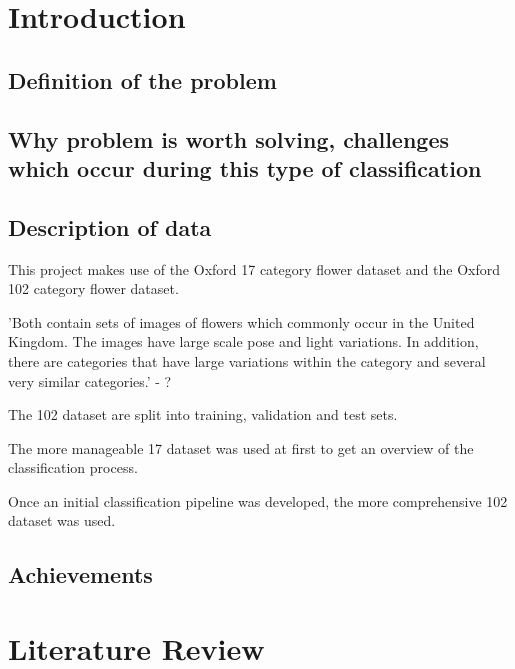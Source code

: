 \documentclass[11pt, a4paper]{report}
\begin{document}
\setlength{\parskip}{0.0cm}
\tableofcontents
\setlength{\parskip}{0.4cm}


\chapter{Introduction}

\section{Definition of the problem} 

\section{Why problem is worth solving, challenges which occur during this type of classification}

\section{Description of data}

This project makes use of the Oxford 17 category flower dataset and the Oxford 102 category flower dataset. 

'Both contain sets of images of flowers which commonly occur in the United Kingdom. The images have large scale pose and light variations. In addition, there are categories that have large variations within the category and several very similar categories.' - ?

The 102 dataset are split into training, validation and test sets.

The more manageable 17 dataset was used at first to get an overview of the classification process.

Once an initial classification pipeline was developed, the more comprehensive 102 dataset was used. 

\section{Achievements}






\chapter{Literature Review}
\end{document}
